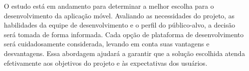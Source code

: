 O estudo está em andamento para determinar a melhor escolha para o desenvolvimento da aplicação móvel. Avaliando as necessidades do projeto, as habilidades da equipe de desenvolvimento e o perfil do público-alvo, a decisão será tomada de forma informada. Cada opção de plataforma de desenvolvimento será cuidadosamente considerada, levando em conta suas vantagens e desvantagens. Essa abordagem ajudará a garantir que a solução escolhida atenda efetivamente aos objetivos do projeto e às expectativas dos usuários.